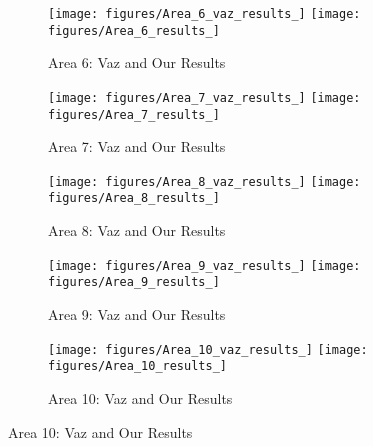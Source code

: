 \begin{figure}
	\ContinuedFloat
	\centering
	\begin{subfigure}{\textwidth}
		\centering
		\texttt{[image: figures/Area\_6\_vaz\_results\_]}
		\texttt{[image: figures/Area\_6\_results\_]}
		\caption{ Area 6: Vaz \cite{vaz_object_based_dune_analysis} and Our Results }
		\label{fig:mixed_ml_grad_area6_results}
	\end{subfigure}
	\begin{subfigure}{\textwidth}
		\centering
		\texttt{[image: figures/Area\_7\_vaz\_results\_]}
		\texttt{[image: figures/Area\_7\_results\_]}
		\caption{ Area 7: Vaz \cite{vaz_object_based_dune_analysis} and Our Results }
		\label{fig:mixed_ml_grad_area7_results}
	\end{subfigure}
	\begin{subfigure}{\textwidth}
		\centering
		\texttt{[image: figures/Area\_8\_vaz\_results\_]}
		\texttt{[image: figures/Area\_8\_results\_]}
		\caption{ Area 8: Vaz \cite{vaz_object_based_dune_analysis} and Our Results }
		\label{fig:mixed_ml_grad_area8_results}
	\end{subfigure}
	\begin{subfigure}{\textwidth}
		\centering
		\texttt{[image: figures/Area\_9\_vaz\_results\_]}
		\texttt{[image: figures/Area\_9\_results\_]}
		\caption{ Area 9: Vaz \cite{vaz_object_based_dune_analysis} and Our Results }
		\label{fig:mixed_ml_grad_area9_results}
	\end{subfigure}
	\begin{subfigure}{\textwidth}
		\centering
		\texttt{[image: figures/Area\_10\_vaz\_results\_]}
		\texttt{[image: figures/Area\_10\_results\_]}
		\caption{ Area 10: Vaz \cite{vaz_object_based_dune_analysis} and Our Results }
		\label{fig:mixed_ml_grad_area10_results}
	\end{subfigure}
\end{figure}
